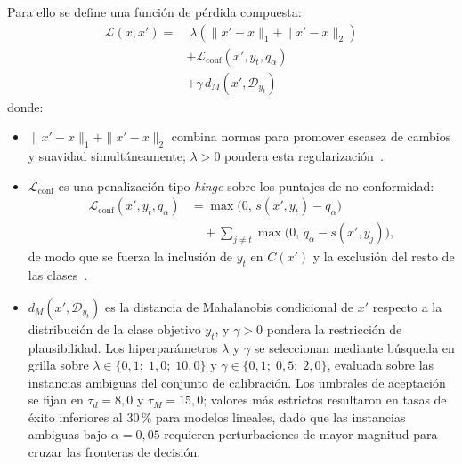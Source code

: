 \documentclass[conference]{IEEEtran}
\begin{document}
Para ello se define una función de pérdida compuesta:
\begin{equation}
    \begin{aligned}
        \mathcal{L}(x,x') =&\;
        \lambda \left(\|x'-x\|_1 + \|x'-x\|_2\right) \\
        &+ \mathcal{L}_{\mathrm{conf}}(x', y_t, q_\alpha) \\
        &+ \gamma \, d_M(x', \mathcal{D}_{y_t})
    \end{aligned}
    \label{eq:loss}
\end{equation}
donde:
\begin{itemize}
    \item $\|x'-x\|_1 + \|x'-x\|_2$ combina normas para promover
    escasez de cambios y suavidad simultáneamente; $\lambda>0$ pondera
    esta regularización~\cite{b4}.

    \item $\mathcal{L}_{\mathrm{conf}}$ es una penalización tipo
    \textit{hinge} sobre los puntajes de no conformidad:
    \begin{align}
        \mathcal{L}_{\mathrm{conf}}(x', y_t, q_\alpha)
        &= \max\bigl(0,\, s(x', y_t) - q_\alpha\bigr) \nonumber\\
        &\quad + \sum_{j \neq t} \max\bigl(0,\, q_\alpha - s(x', y_j)\bigr),
        \label{eq:lconf}
    \end{align}
    de modo que se fuerza la inclusión de $y_t$ en $C(x')$ y la
    exclusión del resto de las clases~\cite{b1}.

    \item $d_M(x', \mathcal{D}_{y_t})$ es la distancia de Mahalanobis
    condicional de $x'$ respecto a la distribución de la clase objetivo
    $y_t$, y $\gamma>0$ pondera la restricción de plausibilidad. Los
    hiperparámetros $\lambda$ y $\gamma$ se seleccionan mediante búsqueda
    en grilla sobre $\lambda \in \{0{,}1;\; 1{,}0;\; 10{,}0\}$ y
    $\gamma \in \{0{,}1;\; 0{,}5;\; 2{,}0\}$, evaluada sobre las
    instancias ambiguas del conjunto de calibración. Los umbrales de
    aceptación se fijan en $\tau_d = 8{,}0$ y $\tau_M = 15{,}0$; valores
    más estrictos resultaron en tasas de éxito inferiores al 30\,\% para
    modelos lineales, dado que las instancias ambiguas bajo $\alpha = 0{,}05$
    requieren perturbaciones de mayor magnitud para cruzar las fronteras
    de decisión.
\end{itemize}
\end{document}
